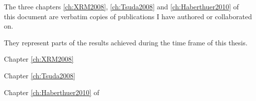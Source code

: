 \label{ch:publications}
The three chapters \ref{ch:XRM2008}, \ref{ch:Tsuda2008} and \ref{ch:Haberthuer2010} of this document are verbatim copies of publications I have authored or collaborated on.

They represent parts of the results achieved during the time frame of this thesis.

Chapter \ref{ch:XRM2008}


Chapter \ref{ch:Tsuda2008} 

Chapter \ref{ch:Haberthuer2010} of